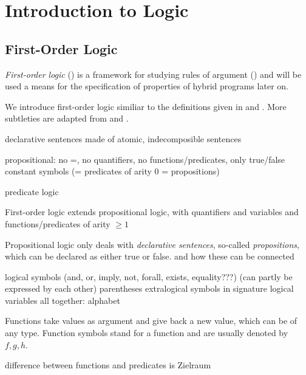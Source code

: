 \chapter{Introduction to Logic}
    \label{sec:introduction-logic}

    \section{First-Order Logic}
        \label{sec:first-order-logic}

        \textit{First-order logic} (\FOL) is a framework for studying rules of argument (\cite{hodges2001ClassicalLogic}) and will be used a means for the specification of properties of hybrid programs later on.

        We introduce first-order logic similiar to the definitions given in \cite{Platzer10HybridSystems} and \cite{Huth04LogicInCS}. More subtleties are adapted from \cite{hodges2001ClassicalLogic} and \cite{rautenberg10ConciseLogic}.

        declarative sentences made of atomic, indecomposible sentences


        propositional: no =, no quantifiers, no functions/predicates, only true/false constant symbols (= predicates of arity 0 = propositions)


        predicate logic

        First-order logic extends propositional logic,
        with quantifiers
        and variables
        and functions/predicates of arity $\geq 1$

        Propositional logic only deals with \textit{declarative sentences}, so-called \textit{propositions}, which can be declared as either true or false. and how these can be connected


        logical symbols (and, or, imply, not, forall, exists, equality???) (can partly be expressed by each other)
        parentheses
        extralogical symbols in signature
        logical variables
        all together: alphabet

        Functions take values as argument and give back a new value, which can be of any type. Function symbols stand for a function and are usually denoted by $f,g,h$.

        difference between functions and predicates is Zielraum

